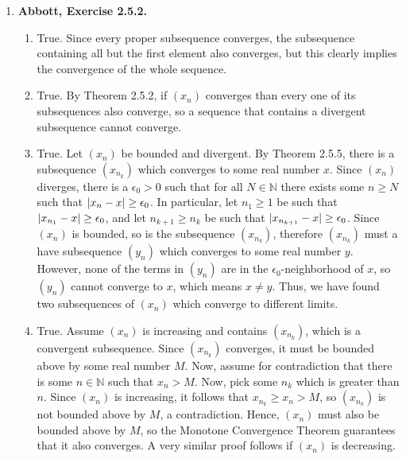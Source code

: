\documentclass{article}
\DeclarePairedDelimiter\abs{\lvert}{\rvert}
\newcommand{\N}{\mathbb{N}}
\newcommand{\exc}[2][Abbott]{\item \textbf{#1, Exercise #2.}}
\begin{document}
\begin{enumerate}
    \exc{2.5.2}
    \begin{enumerate}
        \item True. Since every proper subsequence converges, the subsequence containing all but the first element also converges, but this clearly implies the convergence of the whole sequence.
        
        \item True. By Theorem 2.5.2, if $(x_n)$ converges than every one of its subsequences also converge, so a sequence that contains a divergent subsequence cannot converge.
        
        \item True. Let $(x_n)$ be bounded and divergent. By Theorem 2.5.5, there is a subsequence $(x_{n_k})$ which converges to some real number $x$. Since $(x_n)$ diverges, there is a $\epsilon_0 > 0$ such that for all $N \in \N$ there exists some $n \geq N$ such that $\abs{x_n-x} \geq \epsilon_0$. In particular, let $n_1 \geq 1$ be such that $\abs{x_{n_1}-x} \geq \epsilon_0$, and let $n_{k+1} \geq n_k$ be such that $\abs{x_{n_{k+1}} - x} \geq \epsilon_0$. Since $(x_n)$ is bounded, so is the subsequence $(x_{n_k})$, therefore $(x_{n_k})$ must a have subsequence $(y_n)$ which converges to some real number $y$. However, none of the terms in $(y_n)$ are in the $\epsilon_0$-neighborhood of $x$, so $(y_n)$ cannot converge to $x$, which means $x \neq y$. Thus, we have found two subsequences of $(x_n)$ which converge to different limits.
        
        \item True. Assume $(x_n)$ is increasing and contains $(x_{n_k})$, which is a convergent subsequence. Since $(x_{n_k})$ converges, it must be bounded above by some real number $M$. Now, assume for contradiction that there is some $n \in \N$ such that $x_n > M$. Now, pick some $n_k$ which is greater than $n$. Since $(x_n)$ is increasing, it follows that $x_{n_k} \geq x_n > M$, so $(x_{n_k})$ is not bounded above by $M$, a contradiction. Hence, $(x_n)$ must also be bounded above by $M$, so the Monotone Convergence Theorem guarantees that it also converges. A very similar proof follows if $(x_n)$ is decreasing.
    \end{enumerate}
    

\end{enumerate}
\end{document}
